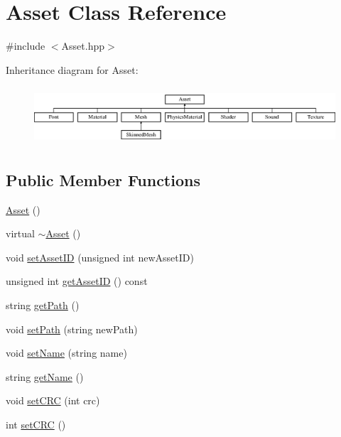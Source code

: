 \hypertarget{class_asset}{}\section{Asset Class Reference}
\label{class_asset}


{\ttfamily \#include $<$Asset.\+hpp$>$}

Inheritance diagram for Asset\+:\begin{figure}[H]
\begin{center}
\leavevmode
\includegraphics[height=2.181818cm]{class_asset}
\end{center}
\end{figure}
\subsection*{Public Member Functions}
\begin{DoxyCompactItemize}
\item 
\hyperlink{class_asset_aae5517f0d77f2fbadaebef7a6988ec25}{Asset} ()
\item 
virtual \hyperlink{class_asset_a2cdb921599e4fdf8fc2e0ce5dd9266ee}{$\sim$\+Asset} ()
\item 
void \hyperlink{class_asset_a920b3238cad8063ca1482dfaedd95a5c}{set\+Asset\+I\+D} (unsigned int new\+Asset\+I\+D)
\item 
unsigned int \hyperlink{class_asset_ac5bf03127f4aa3f192efa7e0bbc80d6c}{get\+Asset\+I\+D} () const 
\item 
string \hyperlink{class_asset_afab04bc636b88dc6fb8735a959611cec}{get\+Path} ()
\item 
void \hyperlink{class_asset_a9d565be1462466aa491a2dfaeeed9c5b}{set\+Path} (string new\+Path)
\item 
void \hyperlink{class_asset_aa9591848b238fa4a43e2f7f8118a8fae}{set\+Name} (string name)
\item 
string \hyperlink{class_asset_aa550074b9d3da8e65ff3164f0cadfd4f}{get\+Name} ()
\item 
void \hyperlink{class_asset_a77fe2f2a76ea9c3c8ee11567079956e0}{set\+C\+R\+C} (int crc)
\item 
int \hyperlink{class_asset_a3accd92508b7b3df783c5eb67b88adfb}{set\+C\+R\+C} ()
\end{DoxyCompactItemize}


